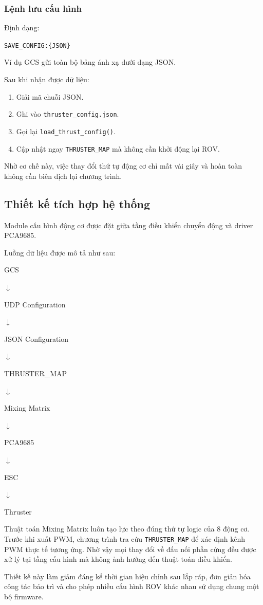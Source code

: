 \documentclass[../DoAn.tex]{subfiles}
\begin{document}
\subsubsection{Lệnh lưu cấu hình}

Định dạng:

\begin{center}
\texttt{SAVE\_CONFIG:\{JSON\}}
\end{center}

Ví dụ GCS gửi toàn bộ bảng ánh xạ dưới dạng JSON.

Sau khi nhận được dữ liệu:

\begin{enumerate}
    \item Giải mã chuỗi JSON.
    \item Ghi vào
    \texttt{thruster\_config.json}.
    \item Gọi lại
    \texttt{load\_thrust\_config()}.
    \item Cập nhật ngay
    \texttt{THRUSTER\_MAP}
    mà không cần khởi động lại ROV.
\end{enumerate}

Nhờ cơ chế này, việc thay đổi thứ tự động cơ chỉ mất vài giây và hoàn
toàn không cần biên dịch lại chương trình.

\subsection{Thiết kế tích hợp hệ thống}

Module cấu hình động cơ được đặt giữa tầng điều khiển chuyển động và
driver PCA9685.

Luồng dữ liệu được mô tả như sau:

\begin{center}
GCS

$\downarrow$

UDP Configuration

$\downarrow$

JSON Configuration

$\downarrow$

THRUSTER\_MAP

$\downarrow$

Mixing Matrix

$\downarrow$

PCA9685

$\downarrow$

ESC

$\downarrow$

Thruster
\end{center}

Thuật toán Mixing Matrix luôn tạo lực theo đúng thứ tự logic của 8
động cơ. Trước khi xuất PWM, chương trình tra cứu
\texttt{THRUSTER\_MAP} để xác định kênh PWM thực tế tương ứng.
Nhờ vậy mọi thay đổi về đấu nối phần cứng đều được xử lý tại tầng
cấu hình mà không ảnh hưởng đến thuật toán điều khiển.

Thiết kế này làm giảm đáng kể thời gian hiệu chỉnh sau lắp ráp,
đơn giản hóa công tác bảo trì và cho phép nhiều cấu hình ROV khác nhau
sử dụng chung một bộ firmware.
\end{document}
